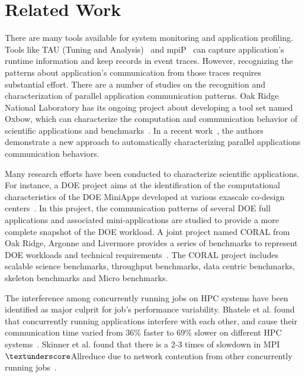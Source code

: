 \section{Related Work}
\label{sec:related_work}

There are many tools available for system monitoring and application profiling. 
Tools like TAU (Tuning and Analysis)~\cite{tau} and mpiP~\cite{mpip} can capture 
application's runtime information and keep records in event traces. 
However, recognizing the patterns about application's communication from those traces requires substantial effort. 
There are a number of studies on the recognition and characterization of parallel application communication patterns. 
Oak Ridge National Laboratory has its ongoing project about developing a tool set named Oxbow, 
which can characterize the computation and communication behavior of scientific applications and benchmarks~\cite{oxbow}. 
In a recent work~\cite{roth}, 
the authors demonstrate a new approach to automatically characterizing parallel applications communication behaviors. 


Many research efforts have been conducted to characterize scientific applications. 
For instance, a DOE project aims at the identification of the computational characteristics of 
the DOE MiniApps developed at various exascale co-design centers~\cite{designforwardwebpage}. 
In this project, the communication patterns of several DOE full applications and associated 
mini-applications are studied to provide a more complete snapshot of the DOE workload. 
A joint project named CORAL from Oak Ridge, Argonne and Livermore provides a series of 
benchmarks to represent DOE workloads and technical requirements~\cite{coral}. 
The CORAL project includes scalable science benchmarks, throughput benchmarks, 
data centric benchmarks, skeleton benchmarks and Micro benchmarks.  

The interference among concurrently running jobs on HPC systems 
have been identified as major culprit for job's performance variability. 
Bhatele et al. found that concurrently running applications interfere with each other, 
and cause their communication time varied from 
36\% faster to 69\% slower on different HPC systems~\cite{abhinav-sc13}. 
Skinner et al. found that  there is a 2-3 times of slowdown in MPI$\textunderscore$Allreduce 
due to network contention from other concurrently running jobs~\cite{skinner}. 

